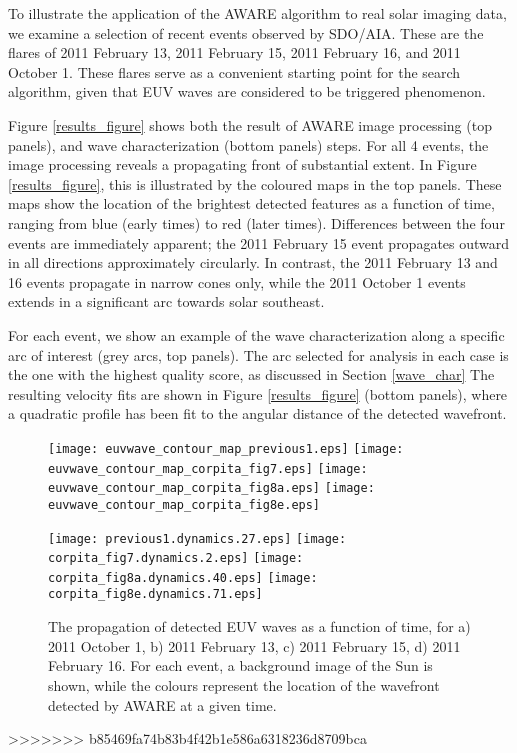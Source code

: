 To illustrate the application of the AWARE algorithm to real solar imaging data, we examine a selection of recent events observed by SDO/AIA. These are the flares of 2011 February 13, 2011 February 15, 2011 February 16, and 2011 October 1. These flares serve as a convenient starting point for the search algorithm, given that EUV waves are considered to be triggered phenomenon. 

Figure \ref{results_figure} shows both the result of AWARE image processing (top panels), and wave characterization (bottom panels) steps. For all 4 events, the image processing reveals a propagating front of substantial extent. In Figure \ref{results_figure}, this is illustrated by the coloured maps in the top panels. These maps show the location of the brightest detected features as a function of time, ranging from blue (early times) to red (later times). Differences between the four events are immediately apparent; the 2011 February 15 event propagates outward in all directions approximately circularly. In contrast, the 2011 February 13 and 16 events propagate in narrow cones only, while the 2011 October 1 events extends in a significant arc towards solar southeast. 

For each event, we show an example of the wave characterization along a specific arc of interest (grey arcs, top panels). The arc selected for analysis in each case is the one with the highest quality score, as discussed in Section \ref{wave_char} The resulting velocity fits are shown in Figure \ref{results_figure} (bottom panels), where a quadratic profile has been fit to the angular distance of the detected wavefront. 

\begin{figure}
\begin{center}
\texttt{[image: euvwave\_contour\_map\_previous1.eps]}
\texttt{[image: euvwave\_contour\_map\_corpita\_fig7.eps]}
\texttt{[image: euvwave\_contour\_map\_corpita\_fig8a.eps]}
\texttt{[image: euvwave\_contour\_map\_corpita\_fig8e.eps]}

\texttt{[image: previous1.dynamics.27.eps]}
\texttt{[image: corpita\_fig7.dynamics.2.eps]}
\texttt{[image: corpita\_fig8a.dynamics.40.eps]}
\texttt{[image: corpita\_fig8e.dynamics.71.eps]}
\caption{The propagation of detected EUV waves as a function of time, for a) 2011 October 1, b) 2011 February 13, c) 2011 February 15, d) 2011 February 16. For each event, a background image of the Sun is shown, while the colours represent the location of the wavefront detected by AWARE at a given time.}
\end{center}
\end{figure}




>>>>>>> b85469fa74b83b4f42b1e586a6318236d8709bca
